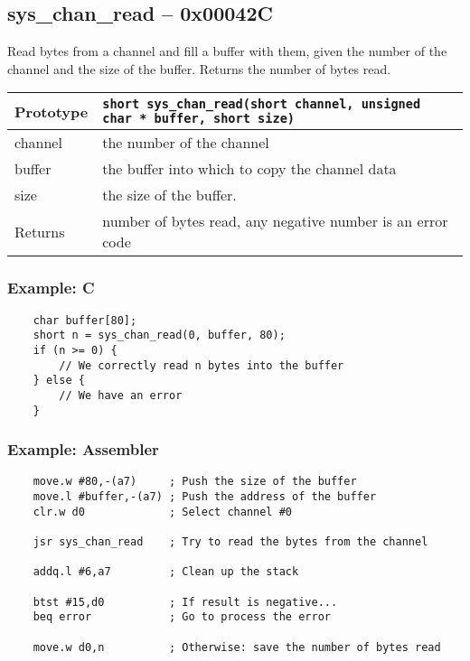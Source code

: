 \subsection*{sys\_chan\_read -- 0x00042C}
Read bytes from a channel and fill a buffer with them, given the number of the channel and the size of the buffer. Returns the number of bytes read.

\bigskip

\begin{tabular}{|l||l|} \hline
Prototype & \lstinline!short sys_chan_read(short channel, unsigned char * buffer, short size)! \\ \hline
channel & the number of the channel \\ \hline
buffer & the buffer into which to copy the channel data \\ \hline
size & the size of the buffer. \\ \hline
Returns & number of bytes read, any negative number is an error code \\ \hline
\end{tabular}

\subsubsection*{Example: C}
\begin{lstlisting}
    char buffer[80];
    short n = sys_chan_read(0, buffer, 80);
    if (n >= 0) {
        // We correctly read n bytes into the buffer
    } else {
        // We have an error
    }
\end{lstlisting}

\subsubsection*{Example: Assembler}
\begin{verbatim}
    move.w #80,-(a7)     ; Push the size of the buffer
    move.l #buffer,-(a7) ; Push the address of the buffer
    clr.w d0             ; Select channel #0
    
    jsr sys_chan_read    ; Try to read the bytes from the channel
    
    addq.l #6,a7         ; Clean up the stack
    
    btst #15,d0          ; If result is negative...
    beq error            ; Go to process the error
    
    move.w d0,n          ; Otherwise: save the number of bytes read
\end{verbatim}


